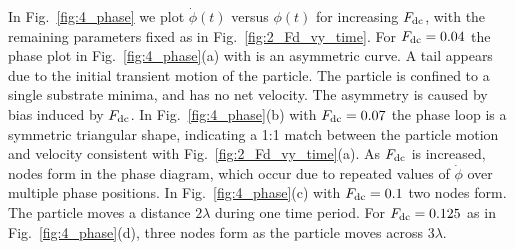 \documentclass[preprint,showpacs,preprintnumbers,amsmath,amssymb,aps,prb]{revtex4-1}
\theoremstyle{remark}
\begin{document}
  In Fig.~\ref{fig:4_phase}
  we plot $\dot{\phi}(t)$ versus $\phi(t)$
  for increasing 
  $F_{\rm dc}$, 
  with the remaining parameters fixed as in Fig.~\ref{fig:2_Fd_vy_time}.
  For
  $F_{\rm dc} = 0.04$
  the phase plot   in Fig.~\ref{fig:4_phase}(a) with is an
  asymmetric curve.
  A tail appears
  due to the initial transient
  motion of the particle.
  The particle is confined to a single
  substrate minima,
  and has no net velocity.
  The asymmetry is caused by bias induced by $F_{\rm dc}$.
  In Fig.~\ref{fig:4_phase}(b)
  with $F_{\rm dc} = 0.07$
  the phase loop is a symmetric triangular shape,
  indicating a 1:1 match between the
  particle motion and velocity consistent with 
  Fig.~\ref{fig:2_Fd_vy_time}(a).
  As $F_{\rm dc}$ is
  increased,
  nodes form in the phase diagram, which
   occur due to repeated values
  of $\dot{\phi}$ over multiple phase positions.
  In Fig.~\ref{fig:4_phase}(c)
  with $F_{\rm dc} = 0.1$
  two nodes form.
  The particle moves a distance $2\lambda$
  during one time period.
For $F_{\rm dc} = 0.125$ as in Fig.~\ref{fig:4_phase}(d),
  three nodes form as the particle moves across $3\lambda$.
  
\end{document}
